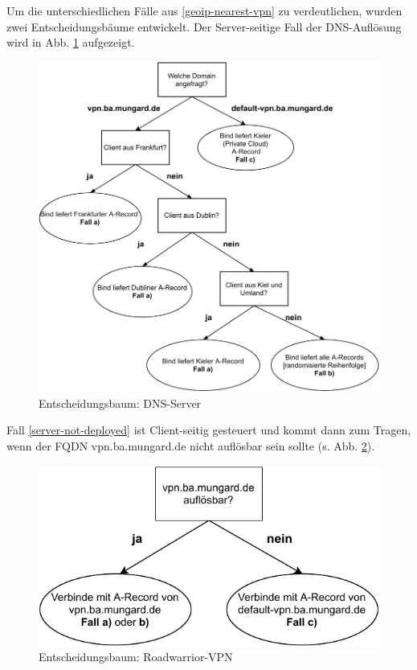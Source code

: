 Um die unterschiedlichen Fälle aus \ref{geoip-nearest-vpn} zu verdeutlichen, wurden zwei Entscheidungsbäume entwickelt. Der Server-seitige Fall der DNS-Auflösung wird in Abb. \ref{grafik:Use-Case_2_Entscheidungsbaum_GeoIP} aufgezeigt.
\begin{figure}[h]
  \centering
  \includegraphics{Figures/entscheidungsbaum_bind_geoip.pdf}
  \caption{Entscheidungsbaum: DNS-Server}
  \label{grafik:Use-Case_2_Entscheidungsbaum_GeoIP}
\end{figure}\FloatBarrier

Fall \ref{server-not-deployed} ist Client-seitig gesteuert und kommt dann zum Tragen, wenn der FQDN vpn.ba.mungard.de nicht auflösbar sein sollte (s. Abb. \ref{grafik:Use-Case_2_Entscheidungsbaum_OpenVPN}).

\begin{figure}[h]
  \centering
  \includegraphics{Figures/entscheidungsbaum_openvpn_config.pdf}
  \caption{Entscheidungsbaum: Roadwarrior-VPN}
  \label{grafik:Use-Case_2_Entscheidungsbaum_OpenVPN}
\end{figure}\FloatBarrier

